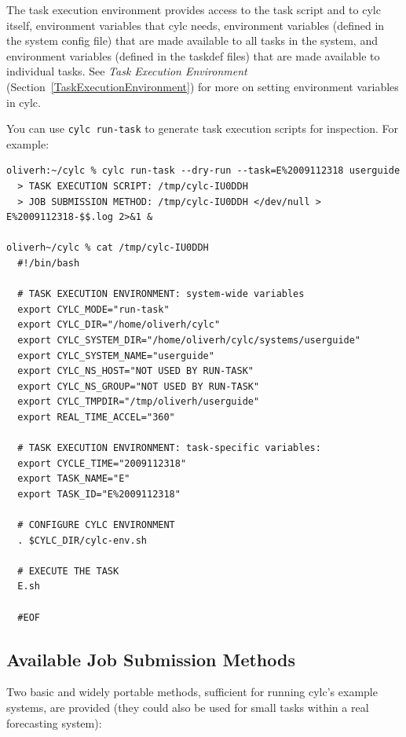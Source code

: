\documentclass[11pt,a4paper]{article}
\begin{document}
The task execution environment provides access to the task script and to
cylc itself, environment variables that cylc needs, environment
variables (defined in the system config file) that are made available to
all tasks in the system, and environment variables (defined in the
taskdef files) that are made available to individual tasks. See {\em
Task Execution Environment} (Section~\ref{TaskExecutionEnvironment}) for
more on setting environment variables in cylc.

\lstset{language=bash}

You can use \lstinline=cylc run-task= to generate task execution scripts
for inspection. For example:


\begin{lstlisting}
oliverh:~/cylc % cylc run-task --dry-run --task=E%2009112318 userguide
  > TASK EXECUTION SCRIPT: /tmp/cylc-IU0DDH
  > JOB SUBMISSION METHOD: /tmp/cylc-IU0DDH </dev/null > E%2009112318-$$.log 2>&1 &
  
oliverh~/cylc % cat /tmp/cylc-IU0DDH
  #!/bin/bash
  
  # TASK EXECUTION ENVIRONMENT: system-wide variables
  export CYLC_MODE="run-task"
  export CYLC_DIR="/home/oliverh/cylc"
  export CYLC_SYSTEM_DIR="/home/oliverh/cylc/systems/userguide"
  export CYLC_SYSTEM_NAME="userguide"
  export CYLC_NS_HOST="NOT USED BY RUN-TASK"
  export CYLC_NS_GROUP="NOT USED BY RUN-TASK"
  export CYLC_TMPDIR="/tmp/oliverh/userguide"
  export REAL_TIME_ACCEL="360"
  
  # TASK EXECUTION ENVIRONMENT: task-specific variables:
  export CYCLE_TIME="2009112318"
  export TASK_NAME="E"
  export TASK_ID="E%2009112318"
  
  # CONFIGURE CYLC ENVIRONMENT
  . $CYLC_DIR/cylc-env.sh
  
  # EXECUTE THE TASK
  E.sh 
  
  #EOF
\end{lstlisting}

\subsection{Available Job Submission Methods}
\label{AvailableJobSubmissionMethods}

Two basic and widely portable methods, sufficient for running cylc's
example systems, are provided (they could also be used for small tasks
within a real forecasting system): 
\end{document}
